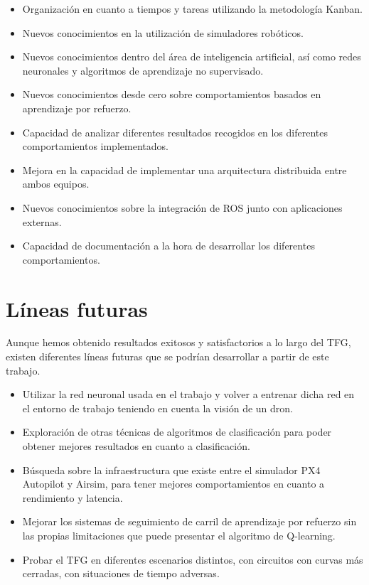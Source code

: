 \begin{itemize}
    \item Organización en cuanto a tiempos y tareas utilizando la metodología Kanban.
    \item Nuevos conocimientos en la utilización de simuladores robóticos.
    \item Nuevos conocimientos dentro del área de inteligencia artificial, así como redes neuronales y algoritmos de
    aprendizaje no supervisado. 
    \item Nuevos conocimientos desde cero sobre comportamientos basados en aprendizaje por refuerzo.
    \item Capacidad de analizar diferentes resultados recogidos en los diferentes comportamientos implementados.
    \item Mejora en la capacidad de implementar una arquitectura distribuida entre ambos equipos.
    \item Nuevos conocimientos sobre la integración de ROS junto con aplicaciones externas.
    \item Capacidad de documentación a la hora de desarrollar los diferentes comportamientos. 
\end{itemize}

\section{Líneas futuras}
\label{lineas_futuras}
Aunque hemos obtenido resultados exitosos y satisfactorios a lo largo del TFG, existen diferentes líneas futuras que se
podrían desarrollar a partir de este trabajo.

\begin{itemize}
\item Utilizar la red neuronal usada en el trabajo y volver a entrenar dicha red en el entorno de trabajo teniendo en
cuenta la visión de un dron.
\item Exploración de otras técnicas de algoritmos de clasificación para poder obtener mejores resultados en cuanto a
clasificación.
\item Búsqueda sobre la infraestructura que existe entre el simulador PX4 Autopilot y Airsim, para tener mejores
comportamientos en cuanto a rendimiento y latencia.
\item Mejorar los sistemas de seguimiento de carril de aprendizaje por refuerzo sin las propias limitaciones que puede
presentar el algoritmo de Q-learning.
\item Probar el TFG en diferentes escenarios distintos, con circuitos con curvas más cerradas, con situaciones de tiempo
adversas. 
\end{itemize}